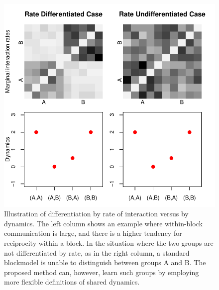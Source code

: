 \begin{figure}
\centering
\includegraphics[scale=.45]{../figs/introexample/all}
\caption{Illustration of differentiation by rate of interaction versus by dynamics.  The left column shows an example where within-block communication is large, and there is a higher tendency for reciprocity within a block.  In the situation where the two groups are not differentiated by rate, as in the right column, a standard blockmodel is unable to distinguish between groups A and B.  The proposed method can, however, learn such groups by employing more flexible definitions of shared dynamics.}
\label{fig:example}
\end{figure}
